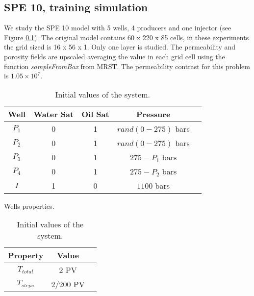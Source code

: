 \documentclass[12pt]{article}
\begin{document}
\newpage
\newpage

\subsection{SPE 10, training simulation}
We study the SPE 10 model with 5 wells, 4 producers and one injector (see Figure \ref{}).  
The original model contains 60 x 220 x 85 cells, in these experiments the grid sized is 16 x 56 x 1. Only one layer is studied. The permeability and porosity fields are upscaled averaging the value in each grid cell using the function \emph{sampleFromBox} from MRST. The permeability contrast for this problem is $1.05\times 10^7$. 
\begin{table}[!ht]
\hspace{-1cm}
\begin{minipage}{.5\textwidth}
\centering
\begin{tabular}{ |c|c|c|c|c|} 
\hline
Well&Water Sat&Oil Sat&Pressure\\
\hline
$P_1$&     0&    1 & $rand(0-275)$ bars \\  
$P_2$& 0& 1& $rand(0-275)$ bars\\
$P_3$&     0&    1 & $275-P_1$ bars \\  
$P_4$& 0& 1& $275-P_2$ bars\\
$I$&     1&    0 & $1100$ bars\\  
\hline
\end{tabular}
\caption{Wells properties.}\label{table:wells1}
\end{minipage}%
\hspace{1cm}
\begin{minipage}{.4\textwidth}
\centering
\begin{tabular}{ |c|c|c|} 
\hline
Property&Value\\
\hline
    $T_{total}$&     2 PV\\
$T_{steps}$& 2/200 PV\\
\hline
\end{tabular}\caption{Initial values of the system.}
\label{table:icw}
\end{minipage}
\hspace{1cm} 
\end{table} 
\end{document}
